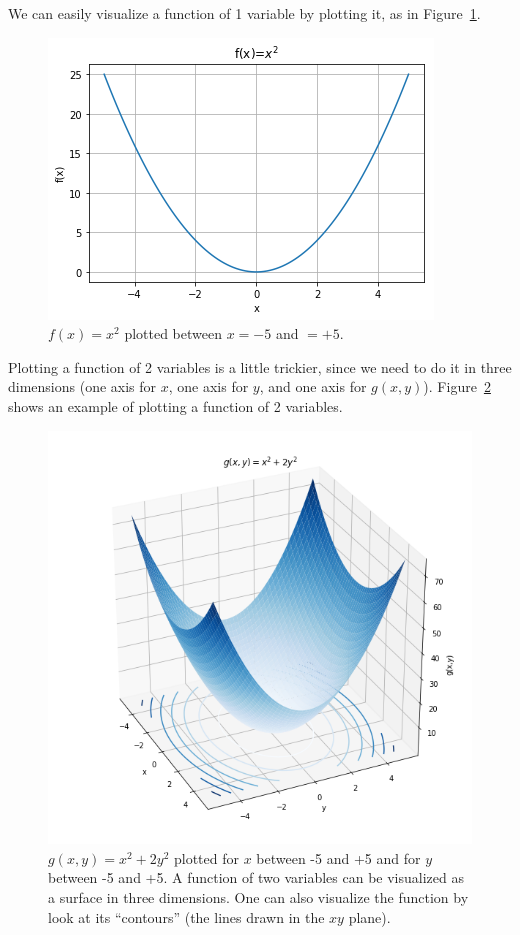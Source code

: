 We can easily visualize a function of 1 variable by plotting it, as in Figure~\ref{fig:calculus:xsquared}.

\begin{figure}[!htbp]
\centering
\includegraphics[width=0.6\linewidth]{files/xsquared-bf8f4ef5428ad1a3df92f0692e26abcd.png}
\caption[]{$f(x)=x^2$ plotted between $x= -5$ and $=+5$.}
\label{fig:calculus:xsquared}
\end{figure}

Plotting a function of 2 variables is a little trickier, since we need to do it in three dimensions (one axis for $x$, one axis for $y$, and one axis for $g(x,y)$). Figure~\ref{fig:calculus:gxy} shows an example of plotting a function of 2 variables.

\begin{figure}[!htbp]
\centering
\includegraphics[width=0.6\linewidth]{files/gxy-16fd31f6194c2b2b9daab98c06eefc56.png}
\caption[]{$g(x,y)=x^2+2y^2$ plotted for $x$ between -5 and +5 and for $y$ between -5 and +5. A function of two variables can be visualized as a surface in three dimensions. One can also visualize the function by look at its ``contours'' (the lines drawn in the $xy$ plane).}
\label{fig:calculus:gxy}
\end{figure}

